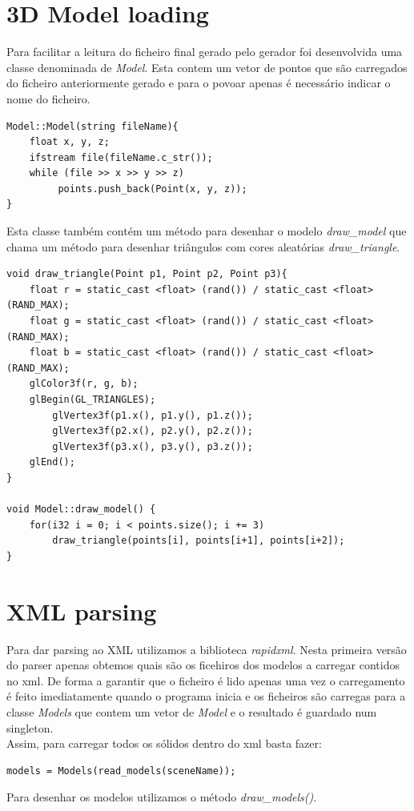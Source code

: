 \documentclass[a4paper]{report}
\begin{document}
\section{3D Model loading}
Para facilitar a leitura do ficheiro final gerado pelo gerador foi desenvolvida
uma classe denominada de \textit{Model}. Esta contem um vetor de pontos que são
carregados do ficheiro anteriormente gerado e para o povoar apenas é necessário
indicar o nome do ficheiro.\\
\begin{lstlisting}
Model::Model(string fileName){
    float x, y, z;
    ifstream file(fileName.c_str());
    while (file >> x >> y >> z)
         points.push_back(Point(x, y, z));
}
\end{lstlisting}
Esta classe também contém um método para desenhar o modelo \textit{draw\_model} que chama um método
para desenhar triângulos com cores aleatórias \textit{draw\_triangle}.
\begin{lstlisting}
void draw_triangle(Point p1, Point p2, Point p3){
    float r = static_cast <float> (rand()) / static_cast <float> (RAND_MAX);
    float g = static_cast <float> (rand()) / static_cast <float> (RAND_MAX);
    float b = static_cast <float> (rand()) / static_cast <float> (RAND_MAX);
    glColor3f(r, g, b);
    glBegin(GL_TRIANGLES);
        glVertex3f(p1.x(), p1.y(), p1.z());
        glVertex3f(p2.x(), p2.y(), p2.z());
        glVertex3f(p3.x(), p3.y(), p3.z());
    glEnd();
}

void Model::draw_model() {
    for(i32 i = 0; i < points.size(); i += 3)
        draw_triangle(points[i], points[i+1], points[i+2]);
}
\end{lstlisting}

\section{XML parsing}
Para dar parsing ao XML utilizamos a biblioteca \textit{rapidxml}. Nesta
primeira versão do parser apenas obtemos quais são os ficehiros dos modelos a
carregar contidos no xml. De forma a garantir que o ficheiro é lido apenas uma
vez o carregamento é feito imediatamente quando o programa inicia e os ficheiros
são carregas para a classe \textit{Models} que contem um vetor de \textit{Model}
e o resultado é guardado num singleton.\\
Assim, para carregar todos os sólidos dentro do xml basta fazer:
\begin{lstlisting}
models = Models(read_models(sceneName));
\end{lstlisting}
Para desenhar os modelos utilizamos o método \textit{draw\_models()}.
\end{document}

